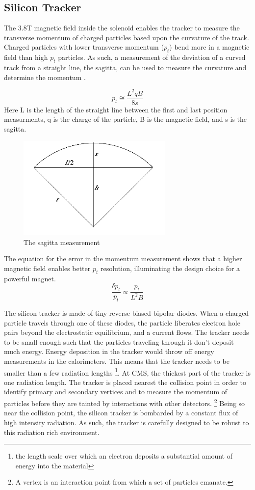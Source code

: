 \subsection{Silicon Tracker}
The 3.8T magnetic field inside the solenoid enables the tracker to measure the transverse momentum of charged particles based upon the curvature of the track. Charged particles with lower transverse momentum ($p_{t}$) bend more in a magnetic field than high $p_{t}$ particles. As such, a measurement of the deviation of a curved track from a straight line, the sagitta, can be used to measure the curvature and determine the momentum \cite{pdgreview}.

\begin{equation}
p_{t} \cong \frac{L^{2}qB}{8s}
\end{equation}
Here L is the length of the straight line between the first and last position measurments, q is the charge of the particle, B is the magnetic field, and s is the sagitta.
\begin{figure}[h!]
  \centering
  \includegraphics[width=3in]{images/sagitta.png}
  \caption
   {The sagitta measurement}
  \label{fig:sagittadrawing}
\end{figure}
The equation for the error in the momentum measurement shows that a higher magnetic field enables better $p_{t}$ resolution, illuminating the design choice for a powerful magnet.
\begin{equation}
\frac{\delta p_{t}}{p_{t}} \propto \frac{p_{t}}{L^{2}B} 
\end{equation}

The silicon tracker is made of tiny reverse biased bipolar diodes. When a charged particle travels through one of these diodes, the particle liberates electron hole pairs beyond the electrostatic equilibrium, and a current flows. The tracker needs to be small enough such that the particles traveling through it don't deposit much energy. Energy deposition in the tracker would throw off energy measurements in the calorimeters. This means that the tracker needs to be smaller than a few radiation lengths \footnote{the length scale over which an electron deposits a substantial amount of energy into the material}. At CMS, the thickest part of the tracker is one radiation length. The tracker is placed nearest the collision point in order to identify primary and secondary vertices and to measure the momentum of particles before they are tainted by interactions with other detectors. \footnote{A vertex is an interaction point from which a set of particles emanate.} Being so near the collision point, the silicon tracker is bombarded by a constant flux of high intensity radiation. As such, the tracker is carefully designed to be robust to this radiation rich environment.

